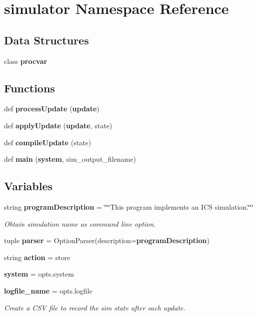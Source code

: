 \section{simulator Namespace Reference}
\label{namespacesimulator}
\subsection*{Data Structures}
\begin{DoxyCompactItemize}
\item 
class {\bf procvar}
\end{DoxyCompactItemize}
\subsection*{Functions}
\begin{DoxyCompactItemize}
\item 
def {\bf process\+Update} ({\bf update})
\item 
def {\bf apply\+Update} ({\bf update}, state)
\item 
def {\bf compile\+Update} (state)
\item 
def {\bf main} ({\bf system}, sim\+\_\+output\+\_\+filename)
\end{DoxyCompactItemize}
\subsection*{Variables}
\begin{DoxyCompactItemize}
\item 
string {\bf program\+Description} = \char`\"{}\char`\"{}\char`\"{}This program implements an I\+C\+S simulation.\char`\"{}\char`\"{}\char`\"{}
\begin{DoxyCompactList}\small\item\em Obtain simulation name as command line option. \end{DoxyCompactList}\item 
tuple {\bf parser} = Option\+Parser(description={\bf program\+Description})
\item 
string {\bf action} = \textquotesingle{}store\textquotesingle{}
\item 
{\bf system} = opts.\+system
\item 
{\bf logfile\+\_\+name} = opts.\+logfile
\begin{DoxyCompactList}\small\item\em Create a C\+S\+V file to record the sim state after each update. \end{DoxyCompactList}\end{DoxyCompactItemize}


